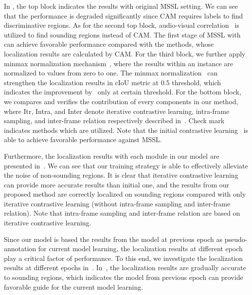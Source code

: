 In , the top block indicates the results with original MSSL setting. 
% 
We can see that the performance is degraded significantly since CAM requires labels to find discriminative regions.
% 
As for the second top block, audio-visual correlation~ is utilized to find sounding regions instead of CAM.
% 
The first stage of MSSL with~ can achieve favorable performance compared with the methods, whose localization results are calculated by CAM.
% 
For the third block, we further apply minmax normalization mechanism~, where the results within an instance are normalized to values from zero to one. 
% 
The minmax normalization~ can strengthen the localization results in cIoU metric at 0.5 threshold, which indicates the improvement by~ only at certain threshold.
% 
For the bottom block, we compares and verifies the contribution of every components in our method, where Itr, Intra, and Inter denote iterative contrastive learning, intra-frame sampling, and inter-frame relation respectively described in~. 
% 
Check mark indicates methods which are utilized.
% 
Note that the initial contrastive learning~ is able to achieve favorable performance against MSSL. 
% 

Furthermore, the localization results with each module in our model are presented in~. 
% 
We can see that our training strategy is able to effectively alleviate the noise of non-sounding regions. 
% 
It is clear that iterative contrastive learning can provide more accurate results than initial one, and the results from our proposed method are correctly localized on sounding regions compared with only iterative contrastive learning (without intra-frame sampling and inter-frame relation).
% 
Note that intra-frame sampling and inter-frame relation are based on iterative contrastive learning.

Since our model is based the results from the model at previous epoch as pseudo-annotation for current model learning, the localization results at different epoch play a critical factor of performance.
% 
To this end, we investigate the localization results at different epochs in~.
% 
In~, the localization results are gradually accurate to sounding regions, which indicates the model from previous epoch can provide favorable guide for the current model learning.


